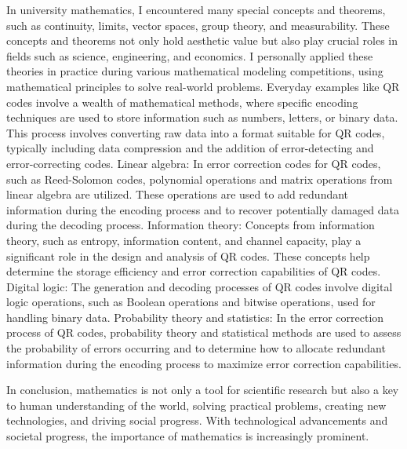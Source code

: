 \begin{tcolorbox}
\hspace{2em}In university mathematics, I encountered many special concepts and theorems, such as continuity, limits, vector spaces, group theory, and measurability. These concepts and theorems not only hold aesthetic value but also play crucial roles in fields such as science, engineering, and economics. I personally applied these theories in practice during various mathematical modeling competitions, using mathematical principles to solve real-world problems. Everyday examples like QR codes involve a wealth of mathematical methods, where specific encoding techniques are used to store information such as numbers, letters, or binary data. This process involves converting raw data into a format suitable for QR codes, typically including data compression and the addition of error-detecting and error-correcting codes. Linear algebra: In error correction codes for QR codes, such as Reed-Solomon codes, polynomial operations and matrix operations from linear algebra are utilized. These operations are used to add redundant information during the encoding process and to recover potentially damaged data during the decoding process. 
Information theory: Concepts from information theory, such as entropy, information content, and channel capacity, play a significant role in the design and analysis of QR codes. These concepts help determine the storage efficiency and error correction capabilities of QR codes. Digital logic: The generation and decoding processes of QR codes involve digital logic operations, such as Boolean operations and bitwise operations, used for handling binary data. Probability theory and statistics: In the error correction process of QR codes, probability theory and statistical methods are used to assess the probability of errors occurring and to determine how to allocate redundant information during the encoding process to maximize error correction capabilities.

\hspace{2em}In conclusion, mathematics is not only a tool for scientific research but also a key to human understanding of the world, solving practical problems, creating new technologies, and driving social progress. With technological advancements and societal progress, the importance of mathematics is increasingly prominent.

\end{tcolorbox}